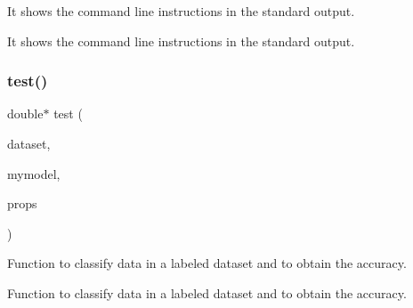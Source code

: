 It shows the command line instructions in the standard output. 

It shows the command line instructions in the standard output. \hypertarget{LIBIRWLS-predict_8h_ae3fc6988def0487bb4bb47b759ba3d0b}{}\label{LIBIRWLS-predict_8h_ae3fc6988def0487bb4bb47b759ba3d0b} 
\subsubsection{\texorpdfstring{test()}{test()}}
{\ttfamily double$\ast$ test (\begin{DoxyParamCaption}\item[{\hyperlink{structsvm__dataset}{svm\+\_\+dataset}}]{dataset,  }\item[{\hyperlink{structmodel}{model}}]{mymodel,  }\item[{\hyperlink{structpredictProperties}{predict\+Properties}}]{props }\end{DoxyParamCaption})}



Function to classify data in a labeled dataset and to obtain the accuracy. 

Function to classify data in a labeled dataset and to obtain the accuracy. 